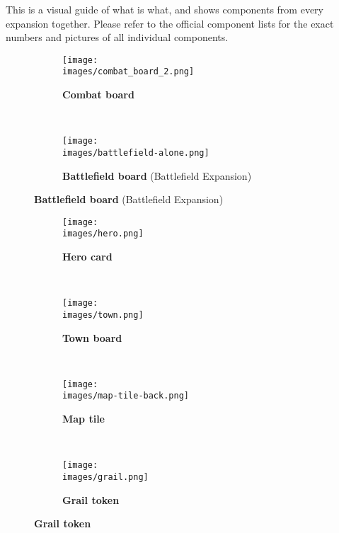 
This is a visual guide of what is what, and shows components from every expansion together. Please refer to the official component lists for the exact numbers and pictures of all individual components.

\vspace*{-1em}
\begin{figure}[H]
  \centering
  \begin{subfigure}[b]{0.4\linewidth}
    \texttt{[image: \\images/combat\_board\_2.png]}
    \caption{\textbf{Combat board}}
  \end{subfigure}
  ~
  \begin{subfigure}[b]{0.5\linewidth}
    \texttt{[image: \\images/battlefield-alone.png]}
    \caption{\textbf{Battlefield board} (Battlefield Expansion)}
  \end{subfigure}
\end{figure}
\vspace*{-1.5em}
\begin{figure}[H]
  \centering
  \begin{subfigure}[b]{0.25\linewidth}
    \texttt{[image: \\images/hero.png]}
    \caption{\textbf{Hero card}}
  \end{subfigure}
  ~
  \begin{subfigure}[b]{0.25\linewidth}
    \texttt{[image: \\images/town.png]}
    \caption{\textbf{Town board}}
  \end{subfigure}
  ~
  \begin{subfigure}[b]{0.25\linewidth}
    \centering
    \texttt{[image: \\images/map-tile-back.png]}
    \caption{\textbf{Map tile}}
  \end{subfigure}
  ~
  \begin{subfigure}[b]{0.15\linewidth}
    \centering
    \texttt{[image: \\images/grail.png]}
    \caption{\textbf{Grail token}}
  \end{subfigure}
\end{figure}
\vspace*{-1.7em}
